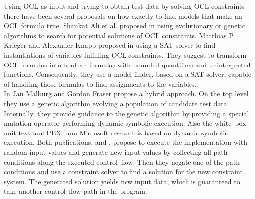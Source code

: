 \documentclass[runningheads,a4paper]{llncs}%
\begin{document}
Using OCL as input and trying to obtain test data by solving OCL constraints there have been several proposals on how exactly to find models that make an OCL formula true. Shaukat Ali et al. proposed in \cite{ali2011search} using evolutionary or genetic algorithms to search for potential solutions of OCL constraints. Matthias P. Krieger and Alexander Knapp proposed in \cite{krieger2008executingUnderspecifiedOCL} using a SAT solver to find instantiations of variables fulfilling OCL constraints. They suggest to transform OCL formulas into boolean formulas with bounded quantifiers and uninterpreted functions. Consequently, they use a model finder, based on a SAT solver, capable of handling those formulas to find assignments to the variables.\\%
In \cite{malburg2011combining} Jan Malburg and Gordon Fraser propose a hybrid approach. On the top level they use a genetic algorithm evolving a population of candidate test data. Internally, they provide guidance to the genetic algorithm by providing a special mutation operator performing dynamic symbolic execution. Also the white--box unit test tool PEX \cite{pex} from Microsoft\textsuperscript{\textregistered} research is based on dynamic symbolic execution. Both publications, \cite{malburg2011combining} and \cite{pex}, propose to execute the implementation with random input values and generate new input values by collecting all path conditions along the executed control--flow. Then they negate one of the path conditions and use a constraint solver to find a solution for the new constraint system. The generated solution yields new input data, which is guaranteed to take another control--flow path in the program.%
\end{document}
